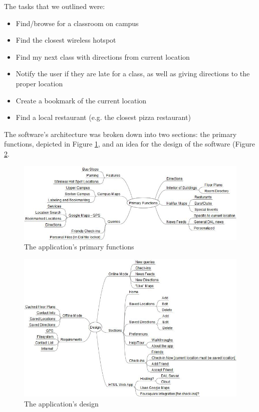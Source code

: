 \documentclass{article}
\begin{document}
The tasks that we outlined were:
\begin{itemize}
\item Find/browse for a classroom on campus
\item Find the closest wireless hotspot
\item Find my next class with directions from current location
\item Notify the user if they are late for a class, as well as giving directions to
the proper location
\item Create a bookmark of the current location
\item Find a local restaurant (e.g. the closest pizza restaurant)
\end{itemize}

The software's architecture was broken down into two sections: the primary
functions, depicted in Figure \ref{fig:functions}, and an idea for the design of
the software (Figure \ref{fig:design}.

\begin{figure}[h!]
\includegraphics[width=\textwidth]{img/Primary-Functions.jpg}
\caption{The application's primary functions}
\label{fig:functions}
\end{figure}

\begin{figure}[h!]
\includegraphics[width=\textwidth]{img/Design.jpg}
\caption{The application's design}
\label{fig:design}
\end{figure}
\end{document}
